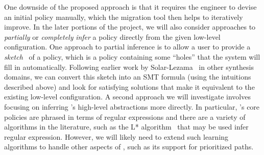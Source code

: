 
One downside of the proposed approach is that it requires the engineer
to devise an initial \Name policy manually, which the migration tool
then helps to iteratively improve.  In the later portions of the project, 
we will also consider approaches to \emph{partially} or 
\emph{completely} {\em infer} a \Name policy directly from the given
low-level configuration.  One approach to partial inference is
to allow a user to provide a \emph{sketch}~\cite{sketch} of a policy,
which is a policy containing some ``holes'' that the system will fill in
automatically.  Following earlier work by Solar-Lezama~\cite{sketch}
in other synthesis domains, we can convert this sketch into an SMT formula
(using the intuitions described above)
and look for satisfying solutions that make it equivalent to 
the existing low-level configuration.
A second approach we will investigate involves focusing on inferring \Name's
high-level abstractions more directly.  In particular, \Name's core policies are
phrased in terms of regular expressions and there are a variety of algorithms
in the literature, such as the L* algorithm~\cite{Angluin87} that may be used
infer regular expression.
However, we will likely need to extend such
learning algorithms to handle other aspects of \Name, such as its
support for prioritized paths.

